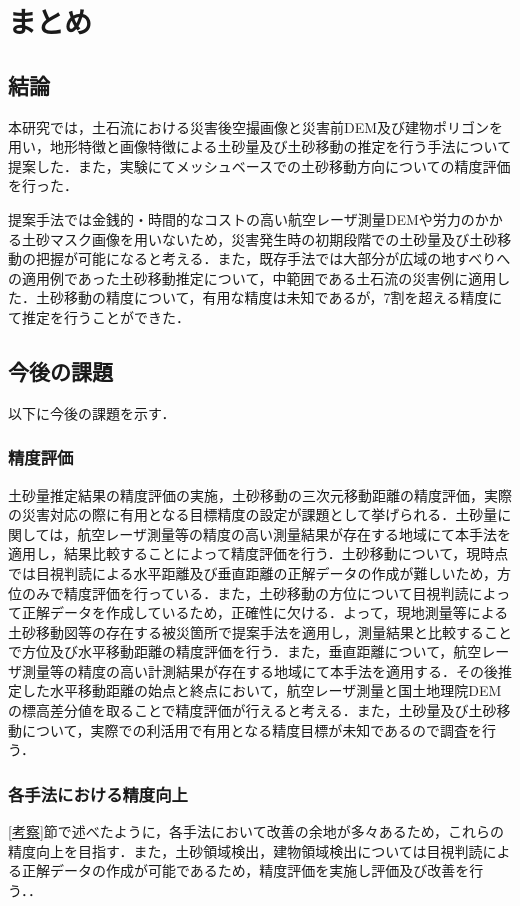 \chapter{まとめ}
  \section{結論}
    本研究では，土石流における災害後空撮画像と災害前DEM及び建物ポリゴンを用い，地形特徴と画像特徴による土砂量及び土砂移動の推定を行う手法について提案した．また，実験にてメッシュベースでの土砂移動方向についての精度評価を行った．

    提案手法では金銭的・時間的なコストの高い航空レーザ測量DEMや労力のかかる土砂マスク画像を用いないため，災害発生時の初期段階での土砂量及び土砂移動の把握が可能になると考える．また，既存手法では大部分が広域の地すべりへの適用例であった土砂移動推定について，中範囲である土石流の災害例に適用した．土砂移動の精度について，有用な精度は未知であるが，7割を超える精度にて推定を行うことができた．


  \section{今後の課題}
    以下に今後の課題を示す．


    \subsection*{精度評価}
      土砂量推定結果の精度評価の実施，土砂移動の三次元移動距離の精度評価，実際の災害対応の際に有用となる目標精度の設定が課題として挙げられる．土砂量に関しては，航空レーザ測量等の精度の高い測量結果が存在する地域にて本手法を適用し，結果比較することによって精度評価を行う．土砂移動について，現時点では目視判読による水平距離及び垂直距離の正解データの作成が難しいため，方位のみで精度評価を行っている．また，土砂移動の方位について目視判読によって正解データを作成しているため，正確性に欠ける．よって，現地測量等による土砂移動図等の存在する被災箇所で提案手法を適用し，測量結果と比較することで方位及び水平移動距離の精度評価を行う．また，垂直距離について，航空レーザ測量等の精度の高い計測結果が存在する地域にて本手法を適用する．その後推定した水平移動距離の始点と終点において，航空レーザ測量と国土地理院DEMの標高差分値を取ることで精度評価が行えると考える．また，土砂量及び土砂移動について，実際での利活用で有用となる精度目標が未知であるので調査を行う．


    \subsection*{各手法における精度向上}
      \ref{考察}節で述べたように，各手法において改善の余地が多々あるため，これらの精度向上を目指す．また，土砂領域検出，建物領域検出については目視判読による正解データの作成が可能であるため，精度評価を実施し評価及び改善を行う．．


